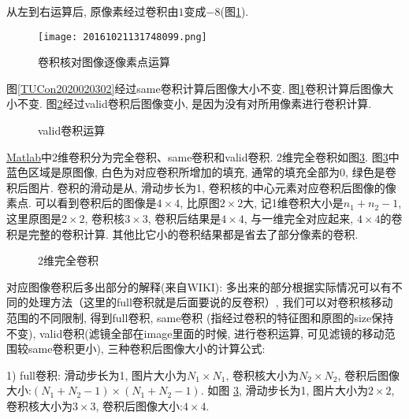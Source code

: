 \begin{example}
从左到右运算后, 原像素经过卷积由$1$变成$-8$(图\ref{CNN20161021131748099}).
\begin{figure}[H]
\centering
\texttt{[image: 20161021131748099.png]}
\caption{卷积核对图像逐像素点运算}
\label{CNN20161021131748099}
\end{figure}
\end{example}

图\ref{TUCon2020020302}经过same卷积计算后图像大小不变. 图\ref{CNN20161021131748099}卷积计算后图像大小不变. 图\ref{20161021135241205}经过valid卷积后图像变小, 是因为没有对所用像素进行卷积计算.
\begin{figure}[H]
\centering
{}
\caption{valid卷积运算}
\label{20161021135241205}
\end{figure}

\href{https://cn.mathworks.com/help/matlab/ref/conv2.html?requestedDomain=www.mathworks.com}{Matlab}中2维卷积分为完全卷积、same卷积和valid卷积.
2维完全卷积如图\ref{CNN20161021141659634}.
图\ref{CNN20161021141659634}中蓝色区域是原图像, 白色为对应卷积所增加的填充, 通常的填充全部为0, 绿色是卷积后图片.
卷积的滑动是从, 滑动步长为1, 卷积核的中心元素对应卷积后图像的像素点.
可以看到卷积后的图像是$4\times 4$, 比原图$2\times 2$大, 记1维卷积大小是$n_1+n_2-1$, 这里原图是$2\times 2$, 卷积核$3\times 3$, 卷积后结果是$4\times 4$, 与一维完全对应起来,
$4\times 4$的卷积是完整的卷积计算. 其他比它小的卷积结果都是省去了部分像素的卷积.
\begin{figure}[H]
\centering
{}
\caption{2维完全卷积}
\label{CNN20161021141659634}
\end{figure}
对应图像卷积后多出部分的解释(来自WIKI): 多出来的部分根据实际情况可以有不同的处理方法（这里的full卷积就是后面要说的反卷积）,
我们可以对卷积核移动范围的不同限制, 得到full卷积, same卷积 (指经过卷积的特征图和原图的size保持不变), valid卷积(滤镜全部在image里面的时候, 进行卷积运算, 可见滤镜的移动范围较same卷积更小), 三种卷积后图像大小的计算公式:

1) full卷积: 滑动步长为1, 图片大小为$N_1\times N_1$, 卷积核大小为$N_2\times N_2$, 卷积后图像大小:$(N_1+N_2-1) \times (N_1+N_2-1)$.
如图 \ref{CNN20161021141659634}, 滑动步长为1, 图片大小为$2\times 2$, 卷积核大小为$3\times 3$, 卷积后图像大小:$4\times 4$.

